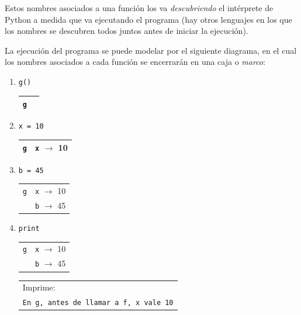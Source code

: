 Estos nombres asociados a una función los va {\it descubriendo} el intérprete de
Python a medida que va ejecutando el programa (hay otros lenguajes en los
que los nombres se descubren todos juntos antes de iniciar la ejecución).

La ejecución del programa se puede modelar por el siguiente diagrama, en el
cual los nombres asociados a cada función se encerrarán en una caja o {\it
marco}:

\newcommand{\currentframe}{\raisebox{1pt}{\tiny$\blacktriangleright$\normalsize} }

\begin{enumerate}

\item  \verb|g()   | \hspace{1.5cm}
	\begin{tabular}{r|r|}
	\hline
	\currentframe \verb|g|&\phantom{\verb|x| $\rightarrow$ 10} \\
	\hline
	\end{tabular}

\item  \verb|x = 10| \hspace{1.5cm}
	\begin{tabular}{r|r|}
	\hline
	\currentframe \verb|g|& \verb|x| $\rightarrow$ 10 \\
	\hline
	\end{tabular}

\item  \verb|b = 45| \hspace{1.5cm}
	\begin{tabular}{r|r|}
	\hline
	\currentframe \verb|g|& \verb|x| $\rightarrow$ 10 \\
	        & \verb|b| $\rightarrow$ 45 \\
	\hline
	\end{tabular}

\item  \verb|print | \hspace{1.5cm}
	\begin{tabular}{r|r|}
	\hline
	\currentframe \verb|g|& \verb|x| $\rightarrow$ 10 \\
	             & \verb|b| $\rightarrow$ 45 \\
	\hline
	\end{tabular}
	\hspace{1cm}
	\begin{tabular}{l}
	Imprime: \\
	{\small\tt En g, antes de llamar a f, x vale 10}
	\end{tabular}


\end{enumerate}
